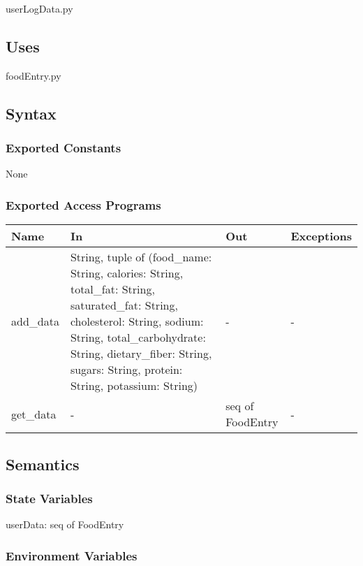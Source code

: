 \documentclass[12pt, titlepage]{article}
\begin{document}
userLogData.py

\subsection{Uses}
foodEntry.py

\subsection{Syntax}

\subsubsection{Exported Constants}
None

\subsubsection{Exported Access Programs}

\begin{center}
	\begin{tabular}{p{2cm} p{5cm} p{3cm} p{2cm}}
		\hline
		\textbf{Name} & \textbf{In} & \textbf{Out} & \textbf{Exceptions} \\
		\hline
		add\_data & String, tuple of (food\_name: String, calories: String, total\_fat: String, saturated\_fat: String, cholesterol: String, sodium: String, total\_carbohydrate: String, dietary\_fiber: String, sugars: String, protein: String, potassium: String) & - & - \\
		get\_data & - & seq of FoodEntry & - \\
		\hline
	\end{tabular}
\end{center}

\subsection{Semantics}

\subsubsection{State Variables}
userData: seq of FoodEntry


\subsubsection{Environment Variables}
\end{document}
